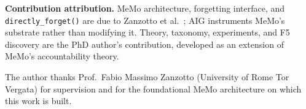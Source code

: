\documentclass{ceurart}
\begin{document}
\textbf{Contribution attribution.}
MeMo architecture, forgetting interface, and \texttt{directly\_forget()} are due
to Zanzotto et al.~\citep{zanzotto2025memo}; AIG instruments MeMo's substrate
rather than modifying it. Theory, taxonomy, experiments, and F5 discovery are the PhD
author's contribution, developed as an extension of MeMo's accountability theory.

\begin{acknowledgments}
The author thanks Prof.\ Fabio Massimo Zanzotto (University of Rome Tor Vergata)
for supervision and for the foundational MeMo architecture on which this work
is built.
\end{acknowledgments}

\end{document}
